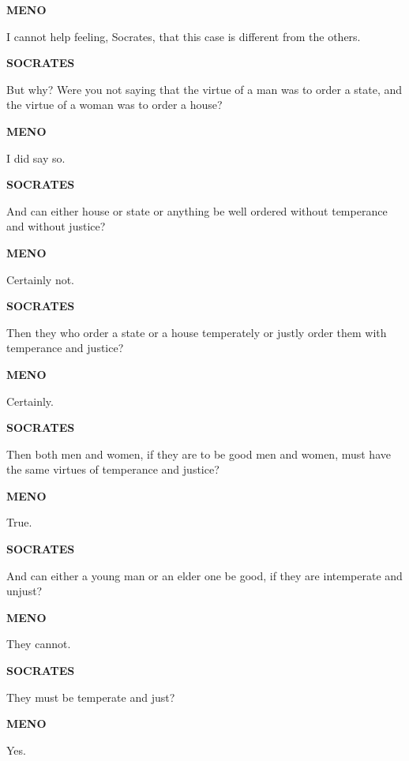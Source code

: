 \documentclass[11pt,letter]{article}
\begin{document}
\par \textbf{MENO}
\par   I cannot help feeling, Socrates, that this case is different from the others.

\par \textbf{SOCRATES}
\par   But why? Were you not saying that the virtue of a man was to order a state, and the virtue of a woman was to order a house?

\par \textbf{MENO}
\par   I did say so.

\par \textbf{SOCRATES}
\par   And can either house or state or anything be well ordered without temperance and without justice?

\par \textbf{MENO}
\par   Certainly not.

\par \textbf{SOCRATES}
\par   Then they who order a state or a house temperately or justly order them with temperance and justice?

\par \textbf{MENO}
\par   Certainly.

\par \textbf{SOCRATES}
\par   Then both men and women, if they are to be good men and women, must have the same virtues of temperance and justice?

\par \textbf{MENO}
\par   True.

\par \textbf{SOCRATES}
\par   And can either a young man or an elder one be good, if they are intemperate and unjust?

\par \textbf{MENO}
\par   They cannot.

\par \textbf{SOCRATES}
\par   They must be temperate and just?

\par \textbf{MENO}
\par   Yes.
\end{document}
